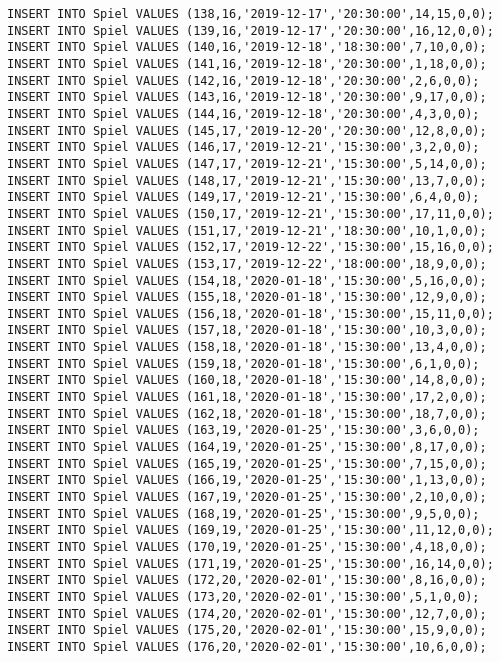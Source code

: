 \documentclass{bschlangaul-aufgabe}
\begin{document}
\begin{verbatim}
INSERT INTO Spiel VALUES (138,16,'2019-12-17','20:30:00',14,15,0,0);
INSERT INTO Spiel VALUES (139,16,'2019-12-17','20:30:00',16,12,0,0);
INSERT INTO Spiel VALUES (140,16,'2019-12-18','18:30:00',7,10,0,0);
INSERT INTO Spiel VALUES (141,16,'2019-12-18','20:30:00',1,18,0,0);
INSERT INTO Spiel VALUES (142,16,'2019-12-18','20:30:00',2,6,0,0);
INSERT INTO Spiel VALUES (143,16,'2019-12-18','20:30:00',9,17,0,0);
INSERT INTO Spiel VALUES (144,16,'2019-12-18','20:30:00',4,3,0,0);
INSERT INTO Spiel VALUES (145,17,'2019-12-20','20:30:00',12,8,0,0);
INSERT INTO Spiel VALUES (146,17,'2019-12-21','15:30:00',3,2,0,0);
INSERT INTO Spiel VALUES (147,17,'2019-12-21','15:30:00',5,14,0,0);
INSERT INTO Spiel VALUES (148,17,'2019-12-21','15:30:00',13,7,0,0);
INSERT INTO Spiel VALUES (149,17,'2019-12-21','15:30:00',6,4,0,0);
INSERT INTO Spiel VALUES (150,17,'2019-12-21','15:30:00',17,11,0,0);
INSERT INTO Spiel VALUES (151,17,'2019-12-21','18:30:00',10,1,0,0);
INSERT INTO Spiel VALUES (152,17,'2019-12-22','15:30:00',15,16,0,0);
INSERT INTO Spiel VALUES (153,17,'2019-12-22','18:00:00',18,9,0,0);
INSERT INTO Spiel VALUES (154,18,'2020-01-18','15:30:00',5,16,0,0);
INSERT INTO Spiel VALUES (155,18,'2020-01-18','15:30:00',12,9,0,0);
INSERT INTO Spiel VALUES (156,18,'2020-01-18','15:30:00',15,11,0,0);
INSERT INTO Spiel VALUES (157,18,'2020-01-18','15:30:00',10,3,0,0);
INSERT INTO Spiel VALUES (158,18,'2020-01-18','15:30:00',13,4,0,0);
INSERT INTO Spiel VALUES (159,18,'2020-01-18','15:30:00',6,1,0,0);
INSERT INTO Spiel VALUES (160,18,'2020-01-18','15:30:00',14,8,0,0);
INSERT INTO Spiel VALUES (161,18,'2020-01-18','15:30:00',17,2,0,0);
INSERT INTO Spiel VALUES (162,18,'2020-01-18','15:30:00',18,7,0,0);
INSERT INTO Spiel VALUES (163,19,'2020-01-25','15:30:00',3,6,0,0);
INSERT INTO Spiel VALUES (164,19,'2020-01-25','15:30:00',8,17,0,0);
INSERT INTO Spiel VALUES (165,19,'2020-01-25','15:30:00',7,15,0,0);
INSERT INTO Spiel VALUES (166,19,'2020-01-25','15:30:00',1,13,0,0);
INSERT INTO Spiel VALUES (167,19,'2020-01-25','15:30:00',2,10,0,0);
INSERT INTO Spiel VALUES (168,19,'2020-01-25','15:30:00',9,5,0,0);
INSERT INTO Spiel VALUES (169,19,'2020-01-25','15:30:00',11,12,0,0);
INSERT INTO Spiel VALUES (170,19,'2020-01-25','15:30:00',4,18,0,0);
INSERT INTO Spiel VALUES (171,19,'2020-01-25','15:30:00',16,14,0,0);
INSERT INTO Spiel VALUES (172,20,'2020-02-01','15:30:00',8,16,0,0);
INSERT INTO Spiel VALUES (173,20,'2020-02-01','15:30:00',5,1,0,0);
INSERT INTO Spiel VALUES (174,20,'2020-02-01','15:30:00',12,7,0,0);
INSERT INTO Spiel VALUES (175,20,'2020-02-01','15:30:00',15,9,0,0);
INSERT INTO Spiel VALUES (176,20,'2020-02-01','15:30:00',10,6,0,0);

\end{verbatim}
\end{document}
